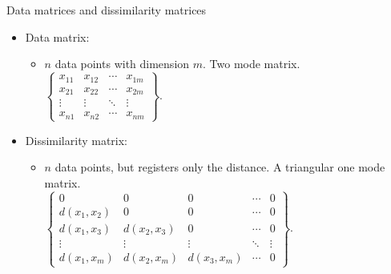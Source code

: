 \documentclass[aspectratio=169,t]{beamer}
\begin{document}
  { 
    \begin{frame}{Data matrices and dissimilarity matrices}
    \centering
    \begin{itemize}
      \item Data matrix:
      \begin{itemize}
        \item $n$ data points with dimension $m$. Two mode matrix.\\
              {$\begin{Bmatrix}
              x_{11} & x_{12} & \cdots & x_{1m}\\
              x_{21} & x_{22} & \cdots & x_{2m}\\
              \vdots & \vdots & \ddots & \vdots\\
              x_{n1} & x_{n2} & \cdots & x_{nm}
              \end{Bmatrix}$.}
      \end{itemize}
      \item Dissimilarity matrix:
      \begin{itemize}
        \item $n$ data points, but registers only the distance. A triangular one mode matrix.\\
              {$\begin{Bmatrix}
              0 & 0 & 0 & \cdots & 0\\
              d(x_{1},x_{2}) & 0 & 0 & \cdots & 0\\
              d(x_{1},x_{3}) & d(x_{2},x_{3}) & 0 & \cdots & 0\\
              \vdots & \vdots & \vdots &\ddots & \vdots\\
              d(x_{1},x_{m}) & d(x_{2},x_{m}) & d(x_{3},x_{m}) & \cdots & 0
              \end{Bmatrix}$.}
      \end{itemize}
    \end{itemize}
    \end{frame}
  }
\end{document}
